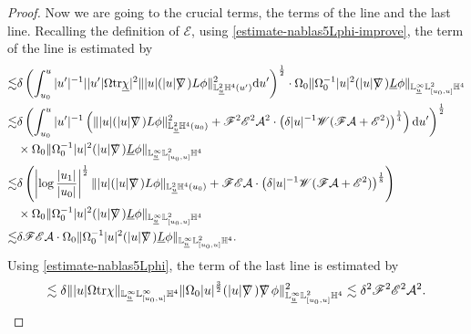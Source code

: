 \documentclass[11pt,reqno]{amsart}
\theoremstyle{definition}
\newtheorem{remark}{Remark}[section]
\numberwithin{equation}{section}
\newcommand{\D}{\mathrm{d}}
\newcommand{\tr}{\mathrm{tr}}
\renewcommand{\L}{\mathbb{L}}
\renewcommand{\H}{\mathbb{H}}
\def\chib{\underline{\chi}}
\def\Lb{\underline{L}}
\def\tr{\mathrm{tr}}
\def\ub{\underline{u}}
\def\nablas{\mbox{$\nabla \mkern -13mu /$ }}
\begin{document}
\begin{proof}
Now we are going to the crucial terms, the  terms of the  line and the last line. Recalling the definition of $\mathscr{E}$, using \eqref{estimate-nablas5Lphi-improve}, the  term of the  line is estimated by
\begin{align*}
\lesssim&\delta\left(\int_{u_0}^u|u'|^{-1}||u'|\Omega\tr\chib|^2\||u|(|u|\nablas)L\phi\|_{\L^2_{\ub}\H^4(u')}^2\D u'\right)^{\frac{1}{2}}\cdot\Omega_0\|\Omega_0^{-1}|u|^2(|u|\nablas)\Lb\phi\|_{\L^\infty_{\ub}\L^2_{[u_0,u]}\H^4}\\
\lesssim&\delta\left(\int_{u_0}^u|u'|^{-1}\left(\||u|(|u|\nablas)L\phi\|_{\L^2_{\ub}\H^4(u_0)}^2+\mathscr{F}^2\mathscr{E}^2\mathcal{A}^2\cdot\left(\delta|u|^{-1}\mathscr{W}(\mathscr{F}\mathcal{A}+\mathscr{E}^2)\right)^{\frac{1}{4}}\right)\D u'\right)^{\frac{1}{2}}\\
&\times\Omega_0\|\Omega_0^{-1}|u|^2(|u|\nablas)\Lb\phi\|_{\L^\infty_{\ub}\L^2_{[u_0,u]}\H^4}\\
\lesssim&\delta\left(\left|\log\frac{|u_1|}{|u_0|}\right|^{\frac{1}{2}}\||u|(|u|\nablas)L\phi\|_{\L^2_{\ub}\H^4(u_0)}+\mathscr{F}\mathscr{E}\mathcal{A}\cdot\left(\delta|u|^{-1}\mathscr{W}(\mathscr{F}\mathcal{A}+\mathscr{E}^2)\right)^{\frac{1}{8}}\right)\\
&\times\Omega_0\|\Omega_0^{-1}|u|^2(|u|\nablas)\Lb\phi\|_{\L^\infty_{\ub}\L^2_{[u_0,u]}\H^4}\\
\lesssim&\delta\mathscr{F}\mathscr{E}\mathcal{A}\cdot\Omega_0\|\Omega_0^{-1}|u|^2(|u|\nablas)\Lb\phi\|_{\L^\infty_{\ub}\L^2_{[u_0,u]}\H^4}.
\end{align*}
Using \eqref{estimate-nablas5Lphi}, the  term of the last line is estimated by
\begin{align*}
\lesssim\delta\||u|\Omega\tr\chi\|_{\L^\infty_{\ub}\L^\infty_{[u_0,u]}\H^4}\|\Omega_0|u|^{\frac{3}{2}}(|u|\nablas)\nablas\phi\|^2_{\L^\infty_{\ub}\L^2_{[u_0,u]}\H^4}\lesssim\delta^2\mathscr{F}^2\mathscr{E}^2\mathcal{A}^2.
\end{align*}


\end{proof}
\end{document}

